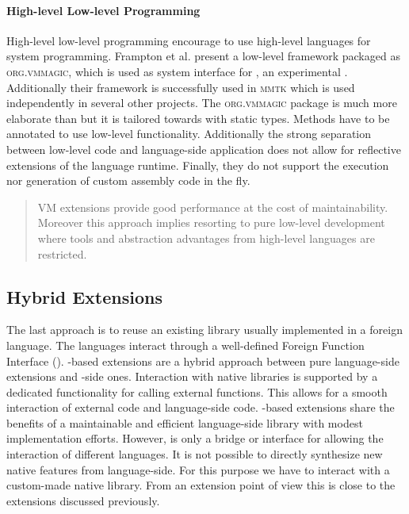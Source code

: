 \paragraph{High-level Low-level Programming}
High-level low-level programming \cite{Fram09a} encourage to use high-level languages for system programming.
Frampton et al. present a low-level framework packaged as \textsc{org.vmmagic}, which is used as system interface for \Jikes, an experimental \Java \VM.
Additionally their framework is successfully used in \textsc{mmtk} \cite{Blac04a} which is used independently in several other projects.
The \textsc{org.vmmagic} package is much more elaborate than \B but it is tailored towards \Java with static types.
Methods have to be annotated to use low-level functionality.
Additionally the strong separation between low-level code and language-side application does not allow for reflective extensions of the language runtime.
Finally, they do not support the execution nor generation of custom assembly code in the fly.


\begin{quote}
VM extensions provide good performance at the cost of maintainability. 
Moreover this approach implies resorting to pure low-level development where tools and abstraction advantages from high-level languages are restricted.
\end{quote}

\subsection{Hybrid Extensions}

The last approach is to reuse an existing library usually implemented in a foreign language.
The languages interact through a well-defined Foreign Function Interface (\FFI).
\FFI-based extensions are a hybrid approach between pure language-side extensions and \VM-side ones.
Interaction with native libraries is supported by a dedicated \VM functionality for calling external functions.
This allows for a smooth interaction of external code and language-side code.
\FFI-based extensions share the benefits of a maintainable and efficient lan\-guage-side library with modest implementation efforts.
However, \FFI is only a bridge or interface for allowing the interaction of different languages. 
It is not possible to directly synthesize new native features from language-side.
For this purpose we have to interact with a custom-made native library.
From an extension point of view this is close to the \VM extensions discussed previously.

